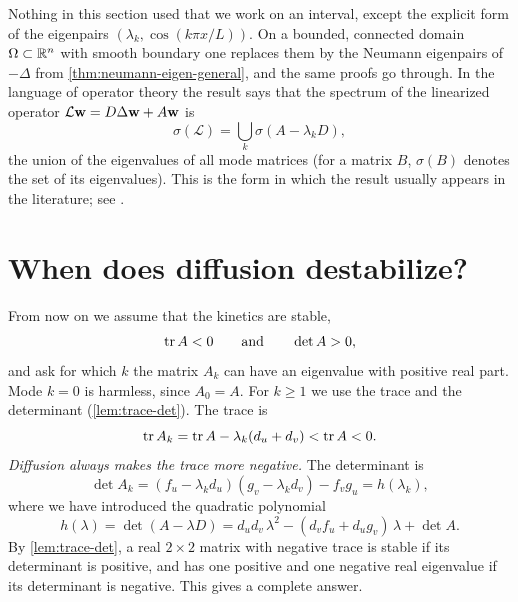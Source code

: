 \begin{remark}\label{rem:general-domain}
Nothing in this section used that we work on an interval, except the explicit form
of the eigenpairs $(\lambda_k,\cos(k\pi x/L))$. On a bounded, connected domain
$\Omega\subset\mathbb{R}^n$ with smooth boundary one replaces them by the Neumann eigenpairs of $-\Delta$ from
\cref{thm:neumann-eigen-general}, and the same proofs go through. In the language
of operator theory the result says that the spectrum of the linearized operator
$\mathcal L\mathbf{w} = D\Delta\mathbf{w} + A\mathbf{w}$ is
\begin{equation*}
  \sigma(\mathcal L) = \bigcup_{k} \sigma(A-\lambda_kD),
\end{equation*}
the union of the eigenvalues of all mode matrices (for a matrix $B$, $\sigma(B)$
denotes the set of its eigenvalues). This is the form in which the
result usually appears in the literature; see \cite{Perthame2015,Murray2003}.
\end{remark}

\section{When does diffusion destabilize?}\label{sec:turing-criterion}

From now on we assume that the kinetics are stable,
\begin{equation*}
  \operatorname{tr} A<0 \qquad\text{and}\qquad \det A>0,
\end{equation*}
and ask for which $k$ the matrix $A_k$ can have an eigenvalue with positive real
part. Mode $k=0$ is harmless, since $A_0=A$. For $k\ge1$ we use the trace and the
determinant (\cref{lem:trace-det}). The trace is
\begin{equation*}
  \operatorname{tr} A_k = \operatorname{tr} A - \lambda_k(d_u+d_v) < \operatorname{tr} A < 0 .
\end{equation*}
\emph{Diffusion always makes the trace more negative.} The determinant is
\begin{equation*}
  \det A_k = (f_u-\lambda_kd_u)(g_v-\lambda_kd_v) - f_vg_u = h(\lambda_k),
\end{equation*}
where we have introduced the quadratic polynomial
\begin{equation}\label{eq:h-def}
  h(\lambda) = \det(A-\lambda D) = d_ud_v\,\lambda^2 - (d_vf_u+d_ug_v)\,\lambda + \det A .
\end{equation}
By \cref{lem:trace-det}, a real $2\times 2$ matrix with negative trace is stable if
its determinant is positive, and has one positive and one negative real eigenvalue
if its determinant is negative. This gives a complete answer.

